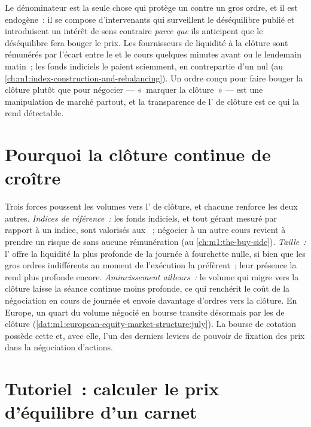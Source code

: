 Le dénominateur est la seule chose qui protège un  contre un gros
ordre, et il est endogène~: il se compose d'intervenants qui surveillent le
déséquilibre publié et introduisent un intérêt de sens contraire \emph{parce que} ils anticipent
que le déséquilibre fera bouger le prix. Les fournisseurs de liquidité à la clôture sont rémunérés par
l'écart entre le  et le cours quelques minutes avant
ou le lendemain matin~; les fonds indiciels le paient sciemment, en contrepartie
d'un  nul (au \cref{ch:m1:index-construction-and-rebalancing}). Un ordre
conçu pour faire bouger la clôture plutôt que pour négocier --- «~marquer la clôture~» ---
est une manipulation de marché partout, et la transparence de l' de clôture
est ce qui la rend détectable.

\section{Pourquoi la clôture continue de croître}

Trois forces poussent les volumes vers l' de clôture, et chacune renforce
les deux autres. \emph{Indices de référence~:} les fonds indiciels, et tout gérant mesuré par rapport à un
indice, sont valorisés aux ~; négocier à un autre cours revient à prendre un
risque de  sans aucune rémunération (au \cref{ch:m1:the-buy-side}).
\emph{Taille~:} l' offre la liquidité la plus profonde de la journée à fourchette nulle,
si bien que les gros ordres indifférents au moment de l'exécution la préfèrent~; leur présence
la rend plus profonde encore. \emph{Amincissement ailleurs~:} le volume qui migre vers la
clôture laisse la séance continue moins profonde, ce qui renchérit le coût de
la négociation en cours de journée et envoie davantage d'ordres vers la clôture. En Europe, un quart du
volume négocié en bourse transite désormais par les  de clôture
(\cref{dat:m1:european-equity-market-structure:july}). La bourse de cotation possède cette  et, avec elle,
l'un des derniers leviers de pouvoir de fixation des prix dans la
négociation d'actions.

\section{Tutoriel~: calculer le prix d'équilibre d'un carnet}\label{tut:m1:auctions:uncross}

